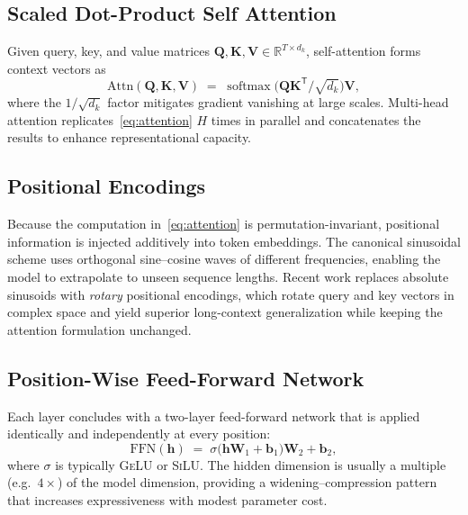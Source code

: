 \subsection{Scaled Dot-Product Self Attention}\label{sec:self_attn}

Given query, key, and value matrices
$\mathbf{Q},\mathbf{K},\mathbf{V}\in\mathbb{R}^{T\times d_{k}}$,
self-attention forms context vectors as
\begin{equation}
  \mathrm{Attn}(\mathbf{Q},\mathbf{K},\mathbf{V})
  \;=\;
  \operatorname{softmax}
  \bigl(
    \mathbf{Q}\mathbf{K}^{\mathsf{T}}/\sqrt{d_{k}}
  \bigr)\mathbf{V},
  \label{eq:attention}
\end{equation}
where the $1/\sqrt{d_{k}}$ factor mitigates gradient vanishing at large
scales.
Multi-head attention replicates~\eqref{eq:attention} $H$ times in
parallel and concatenates the results to enhance representational
capacity.

\subsection{Positional Encodings}\label{sec:pos_enc}

Because the computation in~\eqref{eq:attention} is
permutation-invariant, positional information is injected additively
into token embeddings.
The canonical sinusoidal scheme uses orthogonal sine–cosine waves of
different frequencies, enabling the model to extrapolate to unseen
sequence lengths.  
Recent work replaces absolute sinusoids with \emph{rotary}
positional encodings, which rotate query and key vectors in complex
space and yield superior long-context generalization while keeping the
attention formulation unchanged.

\subsection{Position-Wise Feed-Forward Network}\label{sec:ffn}

Each layer concludes with a two-layer feed-forward network that is
applied identically and independently at every position:
\[
  \mathrm{FFN}(\mathbf{h})
  \;=\;
  \sigma\!\bigl(\mathbf{h}\mathbf{W}_{1}+\mathbf{b}_{1}\bigr)\mathbf{W}_{2}+\mathbf{b}_{2},
\]
where $\sigma$ is typically \textsc{GeLU} or \textsc{SiLU}.
The hidden dimension is usually a multiple (e.g.\ $4\times$) of the
model dimension, providing a widening–compression pattern that
increases expressiveness with modest parameter cost.


